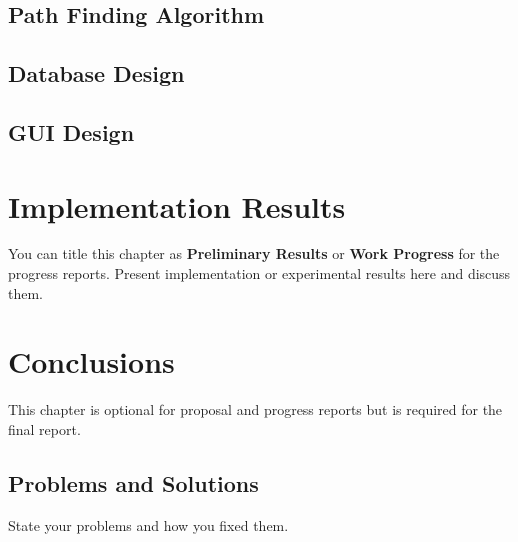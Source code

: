 \documentclass[12pt,oneside,openright,a4paper]{explo-english-project}
\begin{document}
\section{Path Finding Algorithm}

\section{Database Design}

\section{GUI Design}



\chapter{Implementation Results}

You can title this chapter as \textbf{Preliminary Results} or \textbf{Work Progress} for the progress reports. Present implementation or experimental results here and discuss them.


\chapter{Conclusions}

This chapter is optional for proposal and progress reports but 
is required for the final report.

\section{Problems and Solutions}
State your problems and how you fixed them.
\end{document}
